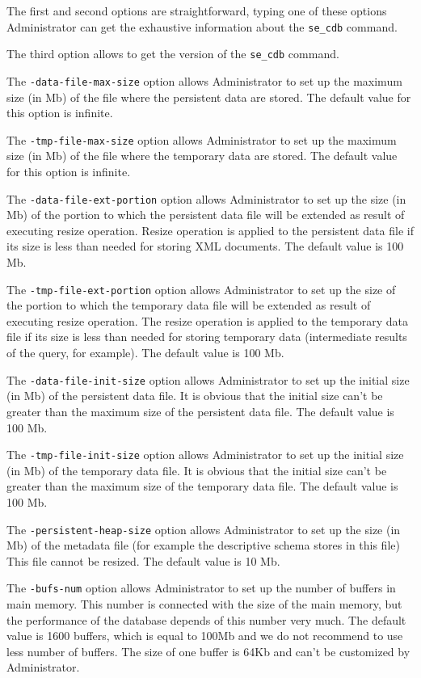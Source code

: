 \documentclass[a4paper,12pt]{article}
\begin{document}
The first and second options are straightforward, typing one of these options Administrator can get the exhaustive information about the \verb!se_cdb! command.

The third option allows to get the version of the \verb!se_cdb! command.

The \verb!-data-file-max-size! option allows Administrator to set up the maximum size (in Mb) of the file where the persistent data are stored. The default value for this option is infinite.

The \verb!-tmp-file-max-size! option allows Administrator to set up the maximum size (in Mb) of the file where the temporary data are stored. The default value for this option is infinite.

The \verb!-data-file-ext-portion! option allows Administrator to set up the size (in Mb) of the portion to which the persistent data file will be extended as result of executing resize operation. Resize operation is applied to the persistent data file if its size is less than needed for storing XML documents. The default value is 100 Mb.

The \verb!-tmp-file-ext-portion! option allows Administrator to set up the size of the portion to which the temporary data file will be extended as result of executing resize operation. The resize operation is applied to the temporary data file if its size is less than needed for storing temporary data (intermediate results of the query, for example). The default value is 100 Mb.

The \verb!-data-file-init-size! option allows Administrator to set up the initial size (in Mb) of the persistent data file. It is obvious that the initial size can't be greater than the maximum size of the persistent data file. The default value is 100 Mb.

The \verb!-tmp-file-init-size! option allows Administrator to set up the initial size (in Mb) of the temporary data file. It is obvious that the initial size can't be greater than the maximum size of the temporary data file. The default value is 100 Mb.

The \verb!-persistent-heap-size! option allows Administrator to set up the size (in Mb) of the metadata file (for example the descriptive schema stores in this file) This file cannot be resized. The default value is 10 Mb.

The \verb!-bufs-num! option allows Administrator to set up the number of buffers in main memory. This number is connected with the size of the main memory, but the performance of the database depends of this number very much. The default value is 1600 buffers, which is equal to 100Mb and we do not recommend to use less number of buffers. The size of one buffer is 64Kb and can't be customized by Administrator.
\end{document}
